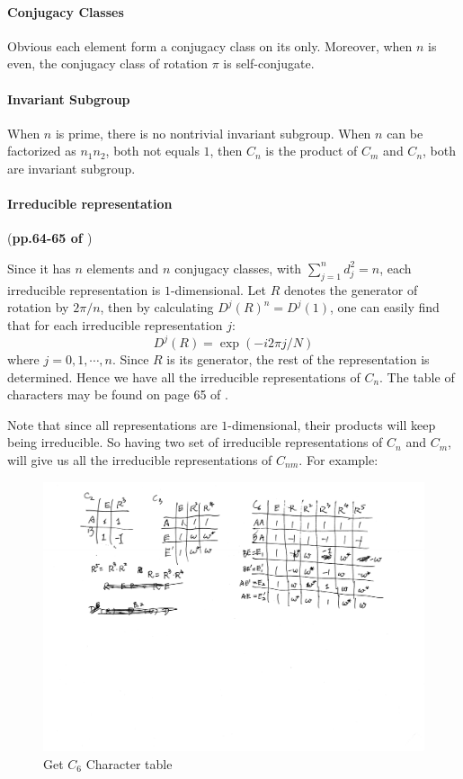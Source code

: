 \paragraph{Conjugacy Classes} Obvious each element form a conjugacy
class on its only. Moreover, when $n$ is even, the conjugacy class of
rotation $\pi$ is self-conjugate.

\paragraph{Invariant Subgroup} When $n$ is prime, there is no
nontrivial invariant subgroup. When $n$ can be factorized as $n_1n_2$,
both not equals $1$, then $C_n$ is the product of $C_m$ and $C_n$,
both are invariant subgroup.

\paragraph{Irreducible representation} (\textbf{pp.64-65 of \cite{book}})

Since it has $n$ elements and $n$ conjugacy classes, with
$\sum_{j=1}^n d_j^2 = n$, each irreducible representation is
$1$-dimensional. Let $R$ denotes the generator of rotation by
$2\pi/n$, then by calculating $D^j(R)^n=D^j(1)$, one can easily find
that for each irreducible representation $j$:
\begin{equation}
    D^j(R) = \exp(-i2\pi j/N)
\end{equation}
where $j=0,1,\cdots, n$. Since $R$ is its generator, the rest of the
representation is determined. Hence we have all the irreducible
representations of $C_n$. The table of characters may be found on page
65 of \cite{book}.

Note that since all representations are $1$-dimensional, their
products will keep being irreducible. So having two set of irreducible
representations of $C_n$ and $C_m$, will give us all the irreducible
representations of $C_{nm}$. For example:
\begin{figure}[H]
    \centering
    \includegraphics[width=0.8\linewidth]{scans/get-C6-character.pdf}
    \caption{Get $C_6$ Character table}
\end{figure}
